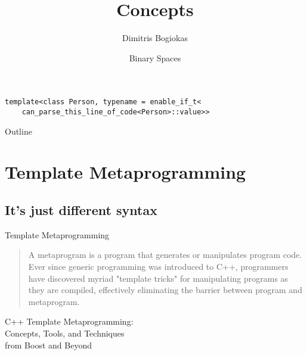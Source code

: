\documentclass{beamer}
\title{Concepts}
\author{Dimitris Bogiokas}
\date{Binary Spaces}
\begin{document}
	\maketitle

\begin{frame}[fragile]{}
\begin{lstlisting}
template<class Person, typename = enable_if_t<
	can_parse_this_line_of_code<Person>::value>>
\end{lstlisting}
\vspace{-3.3em}
\maketitle
\end{frame}

\begin{frame}{Outline}
\tableofcontents
\end{frame}

\section{Template Metaprogramming}
\subsection{It's just different syntax}
\begin{frame}{Template Metaprogramming}
\begin{quote}
A metaprogram is a program that generates or manipulates program code. Ever since generic programming was introduced to C++, programmers have discovered myriad "template tricks" for manipulating programs as they are compiled, effectively eliminating the barrier between program and metaprogram.
\end{quote}
\begin{flushright}
C++ Template Metaprogramming:\\Concepts, Tools, and Techniques\\from Boost and Beyond
\end{flushright}
\end{frame}
\end{document}

